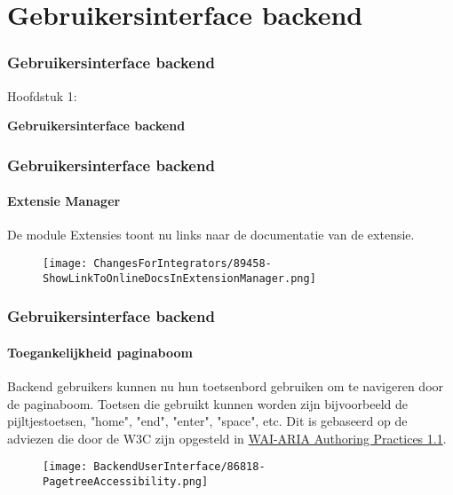 %

\section{Gebruikersinterface backend}
\begin{frame}[fragile]
	\frametitle{Gebruikersinterface backend}

	\begin{center}\huge{Hoofdstuk 1:}\end{center}
	\begin{center}\huge{\color{typo3darkgrey}\textbf{Gebruikersinterface backend}}\end{center}

\end{frame}


\begin{frame}[fragile]
	\frametitle{Gebruikersinterface backend}
	\framesubtitle{Extensie Manager}

	De module Extensies toont nu links naar de documentatie van de extensie.

	\begin{figure}
		\texttt{[image: ChangesForIntegrators/89458-ShowLinkToOnlineDocsInExtensionManager.png]}
	\end{figure}

\end{frame}


\begin{frame}[fragile]
	\frametitle{Gebruikersinterface backend}
	\framesubtitle{Toegankelijkheid paginaboom}

	Backend gebruikers kunnen nu hun toetsenbord gebruiken om te navigeren door de paginaboom.
	Toetsen die gebruikt kunnen worden zijn bijvoorbeeld de pijltjestoetsen, "home", "end", "enter", "space", etc.
	\newline
	Dit is gebaseerd op de adviezen die door de W3C zijn opgesteld in
	\href{https://www.w3.org/TR/wai-aria-practices-1.1/#keyboard-interaction-22}{WAI-ARIA Authoring Practices 1.1}.

	\begin{figure}
		\texttt{[image: BackendUserInterface/86818-PagetreeAccessibility.png]}
	\end{figure}

\end{frame}

